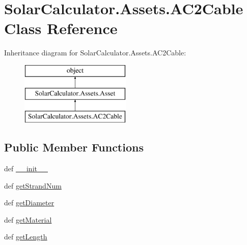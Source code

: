 \hypertarget{class_solar_calculator_1_1_assets_1_1_a_c2_cable}{\section{Solar\-Calculator.\-Assets.\-A\-C2\-Cable Class Reference}
\label{class_solar_calculator_1_1_assets_1_1_a_c2_cable}
}
Inheritance diagram for Solar\-Calculator.\-Assets.\-A\-C2\-Cable\-:\begin{figure}[H]
\begin{center}
\leavevmode
\includegraphics[height=3.000000cm]{class_solar_calculator_1_1_assets_1_1_a_c2_cable}
\end{center}
\end{figure}
\subsection*{Public Member Functions}
\begin{DoxyCompactItemize}
\item 
def \hyperlink{class_solar_calculator_1_1_assets_1_1_a_c2_cable_abff08f5f3126e0ca15c91fad10dcd140}{\-\_\-\-\_\-init\-\_\-\-\_\-}
\item 
def \hyperlink{class_solar_calculator_1_1_assets_1_1_a_c2_cable_a8e7d7df4bea27cb7844bb73b04ef1eac}{get\-Strand\-Num}
\item 
def \hyperlink{class_solar_calculator_1_1_assets_1_1_a_c2_cable_a21b41707ab790fa21c54bebc7846b7d9}{get\-Diameter}
\item 
def \hyperlink{class_solar_calculator_1_1_assets_1_1_a_c2_cable_a4880594d9dc288e23334a1570c216d65}{get\-Material}
\item 
def \hyperlink{class_solar_calculator_1_1_assets_1_1_a_c2_cable_a2133e2dd0fa68a2294957362d19105fb}{get\-Length}
\end{DoxyCompactItemize}
